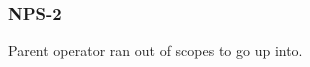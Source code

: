 \subsubsection{NPS-2}\label{sec:error_code_nps_2}

Parent operator ran out of scopes to go up into.


